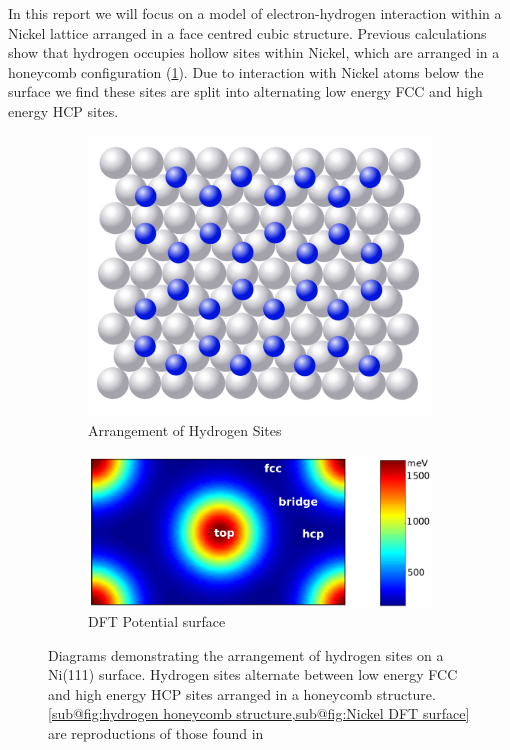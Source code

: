 In this report we will
focus on a model of
electron-hydrogen
interaction within
a Nickel lattice arranged
in a
face centred cubic structure.
Previous calculations
show that hydrogen
occupies hollow sites
within Nickel\cite{doi:10.1063/1.522979},
which are arranged in a
honeycomb configuration
(\cref{sub@fig:hydrogen honeycomb structure}).
Due to interaction with Nickel
atoms below the surface
we find these sites are split
into alternating low energy
FCC and high energy HCP
sites\cite{Jianding-Zhu}.
\begin{figure}[htbp]
    \centering
    \begin{subfigure}{0.45\linewidth}
        \centering
        \includegraphics[width =0.9 \linewidth]{Figures/Model/Hydrogen sites.png}
        \caption{Arrangement of Hydrogen Sites
        }\label{sub@fig:hydrogen honeycomb structure}
    \end{subfigure}
    \hfill
    \begin{subfigure}{0.45\linewidth}
        \centering
        \includegraphics[width = 0.9\linewidth]{Figures/Model/Hydrogen DFT Potential.png}
        \caption{DFT Potential surface
        }\label{sub@fig:Nickel DFT surface}
    \end{subfigure}
    \caption{
        Diagrams demonstrating
        the arrangement of hydrogen
        sites on a Ni(111) surface.
        Hydrogen sites alternate
        between low energy FCC and
        high energy HCP sites arranged
        in a honeycomb structure.
        \cref{sub@fig:hydrogen honeycomb structure,sub@fig:Nickel DFT surface}
        are reproductions of those found in\cite{Jianding-Zhu}
    }
\end{figure}
